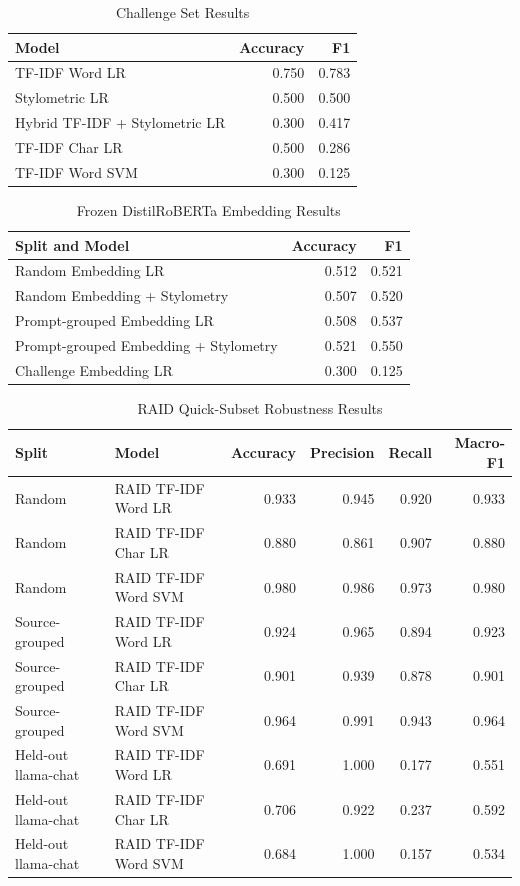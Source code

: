 \documentclass[conference]{IEEEtran}
\begin{document}
\begin{table}[htbp]
\caption{Challenge Set Results}
\centering
\begin{tabular}{lrr}
\toprule
Model & Accuracy & F1 \\
\midrule
TF-IDF Word LR & 0.750 & 0.783 \\
Stylometric LR & 0.500 & 0.500 \\
Hybrid TF-IDF + Stylometric LR & 0.300 & 0.417 \\
TF-IDF Char LR & 0.500 & 0.286 \\
TF-IDF Word SVM & 0.300 & 0.125 \\
\bottomrule
\end{tabular}
\label{tab:challenge}
\end{table}

\begin{table}[htbp]
\caption{Frozen DistilRoBERTa Embedding Results}
\centering
\begin{tabular}{lrr}
\toprule
Split and Model & Accuracy & F1 \\
\midrule
Random Embedding LR & 0.512 & 0.521 \\
Random Embedding + Stylometry & 0.507 & 0.520 \\
Prompt-grouped Embedding LR & 0.508 & 0.537 \\
Prompt-grouped Embedding + Stylometry & 0.521 & 0.550 \\
Challenge Embedding LR & 0.300 & 0.125 \\
\bottomrule
\end{tabular}
\label{tab:transformer}
\end{table}

\begin{table}[htbp]
\caption{RAID Quick-Subset Robustness Results}
\centering
\begin{tabular}{llrrrr}
\toprule
Split & Model & Accuracy & Precision & Recall & Macro-F1 \\
\midrule
Random & RAID TF-IDF Word LR & 0.933 & 0.945 & 0.920 & 0.933 \\
Random & RAID TF-IDF Char LR & 0.880 & 0.861 & 0.907 & 0.880 \\
Random & RAID TF-IDF Word SVM & 0.980 & 0.986 & 0.973 & 0.980 \\
Source-grouped & RAID TF-IDF Word LR & 0.924 & 0.965 & 0.894 & 0.923 \\
Source-grouped & RAID TF-IDF Char LR & 0.901 & 0.939 & 0.878 & 0.901 \\
Source-grouped & RAID TF-IDF Word SVM & 0.964 & 0.991 & 0.943 & 0.964 \\
Held-out llama-chat & RAID TF-IDF Word LR & 0.691 & 1.000 & 0.177 & 0.551 \\
Held-out llama-chat & RAID TF-IDF Char LR & 0.706 & 0.922 & 0.237 & 0.592 \\
Held-out llama-chat & RAID TF-IDF Word SVM & 0.684 & 1.000 & 0.157 & 0.534 \\
\bottomrule
\end{tabular}
\label{tab:raid}
\end{table}
\end{document}
